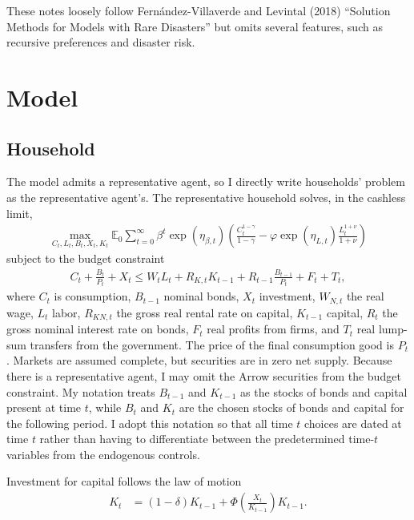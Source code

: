 \documentclass[12 pt, oneside]{article}
\theoremstyle{definition}
\theoremstyle{definition}
\theoremstyle{definition}
\newcommand{\E}{\mathbb{E}}
\begin{document}
These notes loosely follow Fern{\'a}ndez-Villaverde and Levintal (2018) ``Solution Methods for Models with Rare Disasters'' but omits several features, such as recursive preferences and disaster risk.

\section{Model}\label{sec:model}

\subsection{Household}

The model admits a representative agent, so I directly write households' problem as the representative agent's. The representative household solves, in the cashless limit,
\begin{align}\label{eq:hh objective}
  \max_{C_t, L_t, B_t, X_t, K_t} \E_0 \sum_{t = 0}^\infty \beta^t\exp(\eta_{\beta,t}) \left( \frac{C_t^{1 - \gamma}}{1 - \gamma} -  \varphi\exp(\eta_{L, t})\frac{L_t^{1 + \nu}}{1 + \nu}\right)
\end{align}
subject to the budget constraint
\begin{align}\label{eq:hh budget constraint}
  C_t + \frac{B_t}{P_t} + X_t  \leq W_t L_t + R_{K, t} K_{t - 1} + R_{t - 1} \frac{B_{t - 1}}{P_t} + F_t + T_t,
\end{align}
where $C_t$ is consumption, $B_{t - 1}$ nominal bonds, $X_t$ investment, $W_{N, t}$ the real wage, $L_t$ labor, $R_{KN, t}$ the gross real rental rate on capital,
$K_{t - 1}$ capital, $R_t$ the gross nominal interest rate on bonds, $F_t$ real profits from firms, and $T_t$ real lump-sum transfers from the government.
The price of the final consumption good is $P_t$. Markets are assumed complete, but securities are in zero net supply. Because there is a representative agent, I may omit the Arrow securities from the budget constraint. My notation treats $B_{t - 1}$ and $K_{t - 1}$ as the stocks of bonds and capital present at time $t$, while $B_t$ and $K_t$ are the chosen stocks of bonds and capital for the following period. I adopt this notation so that all time $t$ choices are dated at time $t$ rather than having to differentiate between the predetermined time-$t$ variables from the endogenous controls.

Investment for capital follows the law of motion
\begin{align}\label{eq:invst eqn}
  K_t & = (1 - \delta) K_{t - 1} + \Phi\left(\frac{X_t}{K_{t - 1}}\right)K_{t - 1}.
\end{align}
\end{document}
